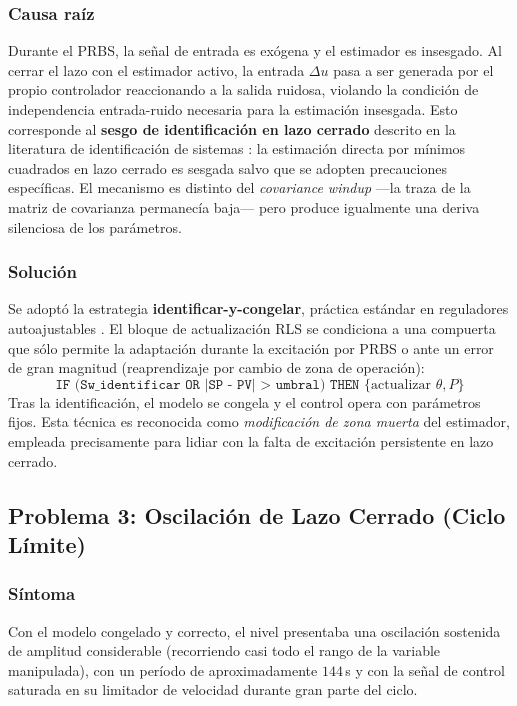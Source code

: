 \subsubsection{Causa raíz}
Durante el PRBS, la señal de entrada es exógena y el estimador es insesgado. Al cerrar el lazo con el estimador activo, la entrada $\Delta u$ pasa a ser generada por el propio controlador reaccionando a la salida ruidosa, violando la condición de independencia entrada-ruido necesaria para la estimación insesgada. Esto corresponde al \textbf{sesgo de identificación en lazo cerrado} descrito en la literatura de identificación de sistemas \cite{ljung1999system}: la estimación directa por mínimos cuadrados en lazo cerrado es sesgada salvo que se adopten precauciones específicas. El mecanismo es distinto del \textit{covariance windup} —la traza de la matriz de covarianza permanecía baja— pero produce igualmente una deriva silenciosa de los parámetros.

\subsubsection{Solución}
Se adoptó la estrategia \textbf{identificar-y-congelar}, práctica estándar en reguladores autoajustables \cite{astrom1995adaptive}. El bloque de actualización RLS se condiciona a una compuerta que sólo permite la adaptación durante la excitación por PRBS o ante un error de gran magnitud (reaprendizaje por cambio de zona de operación):
\[
\texttt{IF (Sw\_identificar OR |SP - PV| > umbral) THEN } \{\text{actualizar } \theta, P\}
\]
Tras la identificación, el modelo se congela y el control opera con parámetros fijos. Esta técnica es reconocida como \textit{modificación de zona muerta} del estimador, empleada precisamente para lidiar con la falta de excitación persistente en lazo cerrado.

\subsection{Problema 3: Oscilación de Lazo Cerrado (Ciclo Límite)}

\subsubsection{Síntoma}
Con el modelo congelado y correcto, el nivel presentaba una oscilación sostenida de amplitud considerable (recorriendo casi todo el rango de la variable manipulada), con un período de aproximadamente $144\,$s y con la señal de control saturada en su limitador de velocidad durante gran parte del ciclo.

